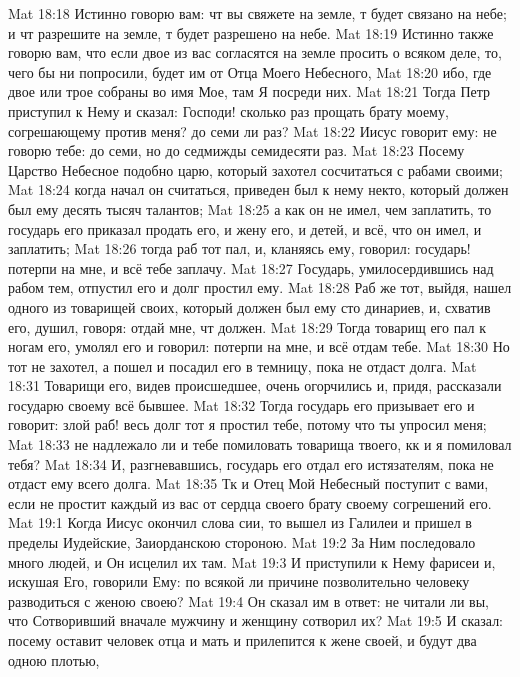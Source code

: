 \vs Mat 18:18 Истинно говорю вам: чт вы свяжете на земле, т будет связано на небе; и чт разрешите на земле, т будет разрешено на небе.
\vs Mat 18:19 Истинно также говорю вам, что если двое из вас согласятся на земле просить о всяком деле, то, чего бы ни попросили, будет им от Отца Моего Небесного,
\vs Mat 18:20 ибо, где двое или трое собраны во имя Мое, там Я посреди них.
\rsbpar\vs Mat 18:21 Тогда Петр приступил к Нему и сказал: Господи! сколько раз прощать брату моему, согрешающему против меня? до семи ли раз?
\vs Mat 18:22 Иисус говорит ему: не говорю тебе: до семи, но до седмижды семидесяти раз.
\rsbpar\vs Mat 18:23 Посему Царство Небесное подобно царю, который захотел сосчитаться с рабами своими;
\vs Mat 18:24 когда начал он считаться, приведен был к нему некто, который должен был ему десять тысяч талантов;
\vs Mat 18:25 а как он не имел, чем заплатить, то государь его приказал продать его, и жену его, и детей, и всё, что он имел, и заплатить;
\vs Mat 18:26 тогда раб тот пал, и, кланяясь ему, говорил: государь! потерпи на мне, и всё тебе заплачу.
\vs Mat 18:27 Государь, умилосердившись над рабом тем, отпустил его и долг простил ему.
\vs Mat 18:28 Раб же тот, выйдя, нашел одного из товарищей своих, который должен был ему сто динариев, и, схватив его, душил, говоря: отдай мне, чт должен.
\vs Mat 18:29 Тогда товарищ его пал к ногам его, умолял его и говорил: потерпи на мне, и всё отдам тебе.
\vs Mat 18:30 Но тот не захотел, а пошел и посадил его в темницу, пока не отдаст долга.
\vs Mat 18:31 Товарищи его, видев происшедшее, очень огорчились и, придя, рассказали государю своему всё бывшее.
\vs Mat 18:32 Тогда государь его призывает его и говорит: злой раб! весь долг тот я простил тебе, потому что ты упросил меня;
\vs Mat 18:33 не надлежало ли и тебе помиловать товарища твоего, кк и я помиловал тебя?
\vs Mat 18:34 И, разгневавшись, государь его отдал его истязателям, пока не отдаст ему всего долга.
\vs Mat 18:35 Тк и Отец Мой Небесный поступит с вами, если не простит каждый из вас от сердца своего брату своему согрешений его.
\vs Mat 19:1 Когда Иисус окончил слова сии, то вышел из Галилеи и пришел в пределы Иудейские, Заиорданскою стороною.
\vs Mat 19:2 За Ним последовало много людей, и Он исцелил их там.
\rsbpar\vs Mat 19:3 И приступили к Нему фарисеи и, искушая Его, говорили Ему: по всякой ли причине позволительно человеку разводиться с женою своею?
\vs Mat 19:4 Он сказал им в ответ: не читали ли вы, что Сотворивший вначале мужчину и женщину сотворил их?
\vs Mat 19:5 И сказал: посему оставит человек отца и мать и прилепится к жене своей, и будут два одною плотью,
